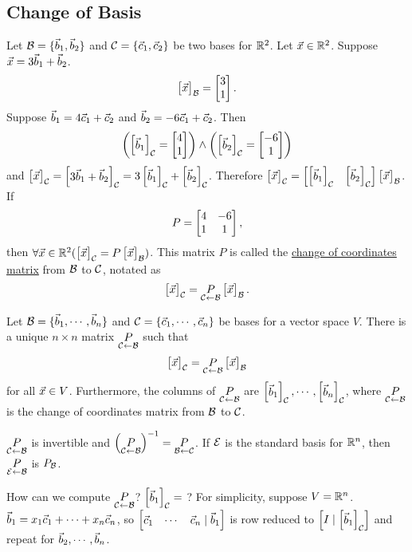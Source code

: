 \documentclass[10pt,a4paper]{article}
\begin{document}
\subsection{Change of Basis}
\begin{example}
	Let $\mc{B} = \{\vb_1,\vb_2\}$ and $\mc{C} = \{\vc_1,\vc_2\}$ be two bases for $\mb{R}^2$. Let $\vx \in \mb{R}^2$. Suppose $\vx = 3 \vb_1 + \vb_2$. $$\mat{\vx}_\mc{B} = \mat{3 \\ 1}.$$ Suppose $\vb_1 = 4\vc_1 + \vc_2$ and $\vb_2 = - 6 \vc_1 + \vc_2$.
	Then $$\left(\mat{\vb_1}_\mc{C} = \mat{4 \\ 1}\right)\land \left(\mat{\vb_2}_\mc{C} = \mat{-6 \\ 1}\right)$$ and $\mat{\vx}_\mc{C} = \mat{3\vb_1 + \vb_2}_\mc{C} = 3 \mat{\vb_1}_\mc{C} + \mat{\vb_2}_\mc{C}$. Therefore $\mat{\vx}_\mc{C} = \mat{\mat{\vb_1}_\mc{C}& \mat{\vb_2}_\mc C} \mat{\vx}_\mc{B}$.
		If $$P = \mat{4 & -6 \\ 1 & 1},$$ then $\forall \vx\in \mb{R}^2(\mat{\vx}_\mc{C} = P \mat{\vx}_\mc{B})$. This matrix $P$ is called the \underline{change of coordinates matrix} from $\mc{B}$ to $\mc{C}$, notated as $$\mat{\vx}_\mc{C} = \underset{\mc{C} \la \mc{B}}{P} \mat{\vx}_\mc{B}.$$
\end{example}
\begin{theorem}
	Let $\mc{B} = \{\vb_1,\cdots,\vb_n\}$ and $\mc C = \{\vc_1,\cdots,\vc_n\}$ be bases for a vector space $V$. There is a unique $n\times n$ matrix $\underset{\mc C\la \mc B}{P}$ such that $$\mat{\vx}_\mc C = \underset{\mc C \la \mc B}{P} \mat{\vx}_\mc B$$ for all $\vx\in V$. Furthermore, the columns of $\underset{\mc C\la \mc B}{P}$ are $\mat{\vb_1}_\mc C,\cdots,\mat{\vb_n}_\mc C$, where
	$\underset{\mc C\la \mc B}{P}$ is the change of coordinates matrix from $\mc B$ to $\mc C$.
\end{theorem}
\begin{note}
	$\underset{\mc C\la \mc B}P$ is invertible and $\left(\underset{\mc C\la \mc B}P \right)^{-1} = \underset{\mc B\la \mc C}P$. If $\mc E$ is the standard basis for $\mb{R}^n$, then $\underset{\mc E\la \mc B}P$ is $P_\mc B$.
\end{note}

How can we compute $\underset{\mc C\la \mc B}P$? $\mat{\vb_1}_\mc C = $ ? For simplicity, suppose $V = \mb{R}^n$. $\vb_1 = x_1\vc_1 + \cdots + x_n\vc_n$, so $\mat{\vc_1 & \cdots & \vc_n \mid \vb_1}$ is row reduced to $\mat{I \mid  \mat{\vb_1}_\mc C}$ and repeat for $\vb_2,\cdots,\vb_n$. 
\end{document}
